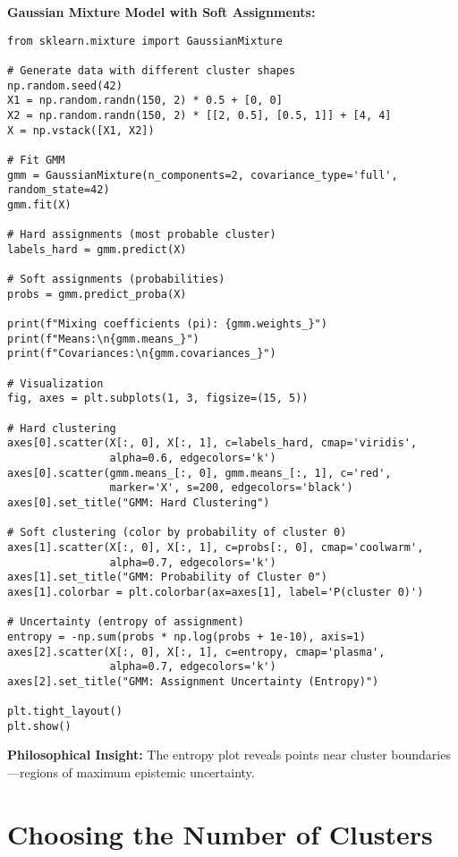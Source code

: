 \begin{codebox}
\textbf{Gaussian Mixture Model with Soft Assignments:}

\begin{lstlisting}
from sklearn.mixture import GaussianMixture

# Generate data with different cluster shapes
np.random.seed(42)
X1 = np.random.randn(150, 2) * 0.5 + [0, 0]
X2 = np.random.randn(150, 2) * [[2, 0.5], [0.5, 1]] + [4, 4]
X = np.vstack([X1, X2])

# Fit GMM
gmm = GaussianMixture(n_components=2, covariance_type='full', random_state=42)
gmm.fit(X)

# Hard assignments (most probable cluster)
labels_hard = gmm.predict(X)

# Soft assignments (probabilities)
probs = gmm.predict_proba(X)

print(f"Mixing coefficients (pi): {gmm.weights_}")
print(f"Means:\n{gmm.means_}")
print(f"Covariances:\n{gmm.covariances_}")

# Visualization
fig, axes = plt.subplots(1, 3, figsize=(15, 5))

# Hard clustering
axes[0].scatter(X[:, 0], X[:, 1], c=labels_hard, cmap='viridis', 
                alpha=0.6, edgecolors='k')
axes[0].scatter(gmm.means_[:, 0], gmm.means_[:, 1], c='red', 
                marker='X', s=200, edgecolors='black')
axes[0].set_title("GMM: Hard Clustering")

# Soft clustering (color by probability of cluster 0)
axes[1].scatter(X[:, 0], X[:, 1], c=probs[:, 0], cmap='coolwarm', 
                alpha=0.7, edgecolors='k')
axes[1].set_title("GMM: Probability of Cluster 0")
axes[1].colorbar = plt.colorbar(ax=axes[1], label='P(cluster 0)')

# Uncertainty (entropy of assignment)
entropy = -np.sum(probs * np.log(probs + 1e-10), axis=1)
axes[2].scatter(X[:, 0], X[:, 1], c=entropy, cmap='plasma', 
                alpha=0.7, edgecolors='k')
axes[2].set_title("GMM: Assignment Uncertainty (Entropy)")

plt.tight_layout()
plt.show()
\end{lstlisting}

\textbf{Philosophical Insight:} The entropy plot reveals points near cluster boundaries---regions of maximum epistemic uncertainty.
\end{codebox}

\section{Choosing the Number of Clusters}

